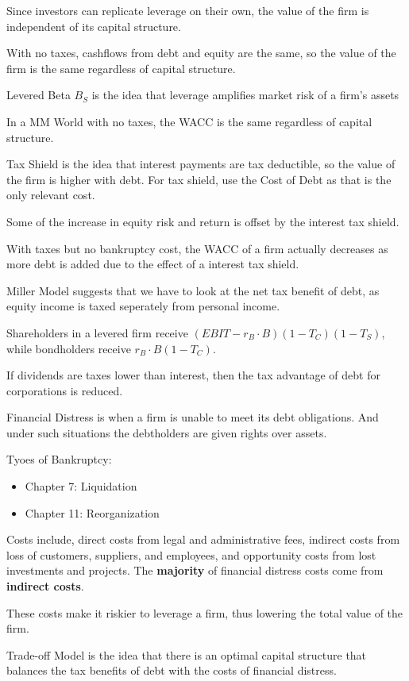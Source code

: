 Since investors can replicate leverage on their own, the value of the firm is independent of its capital structure.

With no taxes, cashflows from debt and equity are the same, so the value of the firm is the same regardless of capital structure.

Levered Beta $B_S$ is the idea that leverage amplifies market risk of a firm's assets

In a MM World with no taxes, the WACC is the same regardless of capital structure.

Tax Shield is the idea that interest payments are tax deductible, so the value of the firm is higher with debt. For tax shield, use the Cost of Debt as that is the only relevant cost.

Some of the increase in equity risk and return is offset by the interest tax shield.

With taxes but no bankruptcy cost, the WACC of a firm actually decreases as more debt is added due to the effect of a interest tax shield.

Miller Model suggests that we have to look at the net tax benefit of debt,
as equity income is taxed seperately from personal income.

Shareholders in a levered firm receive $(EBIT-r_B\cdot B)(1-T_C)(1-T_S)$, while bondholders receive $r_B\cdot B(1-T_C)$.

If dividends are taxes lower than interest, then the tax advantage of debt for
corporations is reduced.

Financial Distress is when a firm is unable to meet its debt obligations. And under such situations
the debtholders are given rights over assets.

Tyoes of Bankruptcy:
\begin{itemize}
    \item Chapter 7: Liquidation
    \item Chapter 11: Reorganization
\end{itemize}
Costs include, direct costs from legal and administrative fees, indirect costs from loss of customers, suppliers, and employees, and opportunity costs from lost investments and projects. The \textbf{majority} of financial distress costs come from \textbf{indirect costs}.

These costs make it riskier to leverage a firm, thus lowering the total value of the firm.

Trade-off Model is the idea that there is an optimal capital structure that balances the tax benefits of debt with the costs of financial distress.

